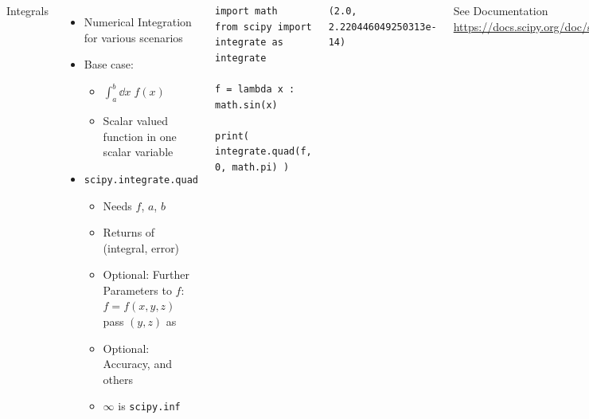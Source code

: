 \begin{frame}[fragile]
%
\begin{columns}[T]
\begin{Large}
	{Integrals}
	\vspace{6pt}
\end{Large}
%
\begin{itemize}
\item Numerical Integration for various scenarios
\item Base case: 
	\begin{itemize}
	\item $\displaystyle \int_{a}^{b} \dd{x} \; f(x)$
	\item Scalar valued function in one scalar variable
	\end{itemize}
\item \texttt{scipy.integrate.quad}
	\begin{itemize}
	\item Needs $f$, $a$, $b$
	\item Returns  of (integral, error)
	\item Optional: Further Parameters to $f$:\\
		$f = f(x, y, z)$ \\
		\Thus pass $(y, z)$ as 
	\item Optional: Accuracy, and others
	\item $\infty$ is \texttt{scipy.inf}
	\end{itemize}
\end{itemize}
%
\begin{codebox}
\begin{verbatim}
import math
from scipy import integrate as integrate

f = lambda x : math.sin(x)

print( integrate.quad(f, 0, math.pi) )
\end{verbatim}
\end{codebox}
%
\begin{cmdbox}
\begin{verbatim}
(2.0, 2.220446049250313e-14)
\end{verbatim}
\end{cmdbox}
%
See Documentation\\
	\scriptsize \url{https://docs.scipy.org/doc/scipy/reference/generated/scipy.integrate.quad.html#scipy.integrate.quad}
\end{columns}
%
\end{frame}

